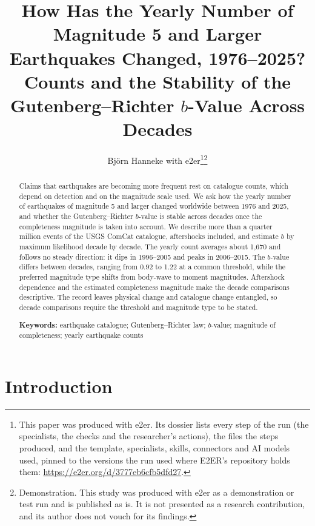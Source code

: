 \documentclass[11pt]{article}
\title{How Has the Yearly Number of Magnitude 5 and Larger Earthquakes Changed, 1976--2025? Counts and the Stability of the Gutenberg--Richter $b$-Value Across Decades}
\author{Björn Hanneke with e2er\thanks{This paper was produced with e2er. Its dossier lists every step of the run (the specialists, the checks and the researcher's actions), the files the steps produced, and the template, specialists, skills, connectors and AI models used, pinned to the versions the run used where E2ER's repository holds them: \url{https://e2er.org/d/3777eb6cfb5dfd27}.}\thanks{Demonstration. This study was produced with e2er as a demonstration or test run and is published as is. It is not presented as a research contribution, and its author does not vouch for its findings.}}
\date{}
\begin{document}
\maketitle

\begin{abstract}
\noindent Claims that earthquakes are becoming more frequent rest on catalogue counts, which depend on detection and on the magnitude scale used. We ask how the yearly number of earthquakes of magnitude 5 and larger changed worldwide between 1976 and 2025, and whether the Gutenberg--Richter $b$-value is stable across decades once the completeness magnitude is taken into account. We describe more than a quarter million events of the USGS ComCat catalogue, aftershocks included, and estimate $b$ by maximum likelihood decade by decade. The yearly count averages about 1,670 and follows no steady direction: it dips in 1996--2005 and peaks in 2006--2015. The $b$-value differs between decades, ranging from 0.92 to 1.22 at a common threshold, while the preferred magnitude type shifts from body-wave to moment magnitudes. Aftershock dependence and the estimated completeness magnitude make the decade comparisons descriptive. The record leaves physical change and catalogue change entangled, so decade comparisons require the threshold and magnitude type to be stated.

\medskip
\noindent\textbf{Keywords:} earthquake catalogue; Gutenberg--Richter law; $b$-value; magnitude of completeness; yearly earthquake counts
\end{abstract}


\section{Introduction}
\end{document}
